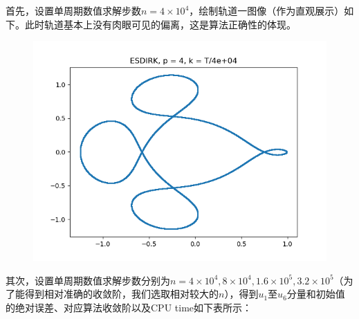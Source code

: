 \documentclass{ctexart}
\begin{document}
\begin{sloppypar}
首先，设置单周期数值求解步数$n = 4 \times 10^4$，绘制轨道一图像（作为直观展示）如下。此时轨道基本上没有肉眼可见的偏离，这是算法正确性的体现。
\begin{figure}[H]
\centering
\includegraphics[scale = 0.45]{./report_src/Figure_27.png}
\end{figure}
其次，设置单周期数值求解步数分别为$n = 4 \times 10^4,8 \times 10^4,1.6 \times 10^5, 3.2 \times 10^5$（为了能得到相对准确的收敛阶，我们选取相对较大的$n$），得到$u_1$至$u_6$分量和初始值的绝对误差、对应算法收敛阶以及CPU time如下表所示：


\end{sloppypar}
\end{document}
